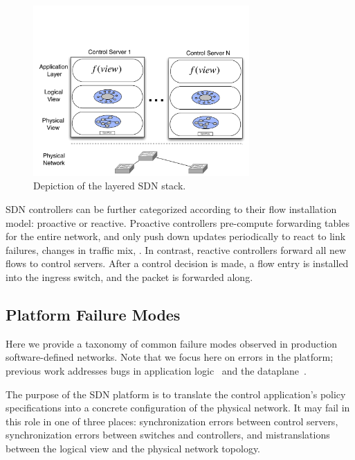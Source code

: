 \begin{figure}[t]
    \includegraphics[width=3.25in]{../diagrams/architecture/SDN_stack.pdf}
    \caption[]{\label{fig:basicarch} Depiction of the layered SDN stack.} 
\end{figure}

SDN controllers can be further categorized according to their flow
installation model: proactive or reactive.
Proactive controllers pre-compute forwarding tables for the entire network,
and only push down updates periodically to react to link failures, changes in
traffic mix, \etc. In contrast, reactive controllers forward all new flows to
control servers. After a control decision is made, a flow entry is installed
into the ingress switch, and the packet is forwarded along.

\subsection{Platform Failure Modes}

Here we provide a taxonomy of common failure modes observed in
production software-defined networks. Note that we focus here on errors in the
platform; previous work addresses bugs in application
logic~\cite{nice} and the dataplane~\cite{anteater,hsa}.

The purpose of the SDN platform is to translate the control application's policy
specifications into a concrete configuration of the physical network. It may
fail in this role in one of three places: synchronization errors between control
servers, synchronization errors between switches and controllers, and
mistranslations between the logical view and the physical network topology.


